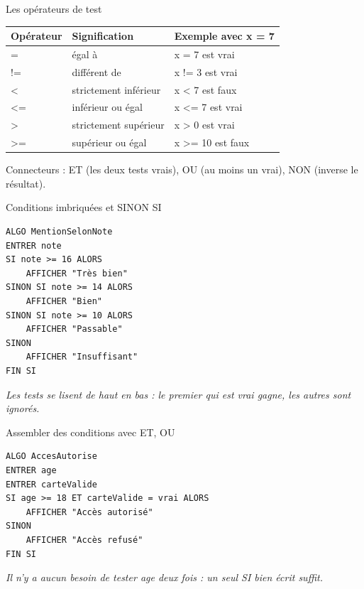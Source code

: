 \documentclass[aspectratio=169,11pt]{beamer}
\begin{document}
\begin{frame}{Les opérateurs de test}
\renewcommand{\arraystretch}{1.3}\small
\begin{center}
\begin{tabular}{lll}
\toprule
\textbf{\color{PyBleu}Opérateur} & \textbf{\color{PyBleu}Signification} & \textbf{\color{PyBleu}Exemple avec x = 7} \\
\midrule
= & égal à & x = 7 est vrai \\
!= & différent de & x != 3 est vrai \\
< & strictement inférieur & x < 7 est faux \\
<= & inférieur ou égal & x <= 7 est vrai \\
> & strictement supérieur & x > 0 est vrai \\
>= & supérieur ou égal & x >= 10 est faux \\
\bottomrule
\end{tabular}
\end{center}

\vspace{4pt}

{\small\color{PyGris}Connecteurs : ET (les deux tests vrais), OU (au moins un vrai), NON (inverse le résultat).}
\end{frame}

\begin{frame}[fragile]{Conditions imbriquées et SINON SI}

\begin{lstlisting}[style=py]
ALGO MentionSelonNote
ENTRER note
SI note >= 16 ALORS
    AFFICHER "Très bien"
SINON SI note >= 14 ALORS
    AFFICHER "Bien"
SINON SI note >= 10 ALORS
    AFFICHER "Passable"
SINON
    AFFICHER "Insuffisant"
FIN SI
\end{lstlisting}
\vspace{0.5pt}

{\small\color{PyGris}\itshape Les tests se lisent de haut en bas : le premier qui est vrai gagne, les autres sont ignorés.}

\end{frame}

\begin{frame}[fragile]{Assembler des conditions avec ET, OU}

\begin{lstlisting}[style=py]
ALGO AccesAutorise
ENTRER age
ENTRER carteValide
SI age >= 18 ET carteValide = vrai ALORS
    AFFICHER "Accès autorisé"
SINON
    AFFICHER "Accès refusé"
FIN SI
\end{lstlisting}
\vspace{0.5pt}

{\small\color{PyGris}\itshape Il n'y a aucun besoin de tester age deux fois : un seul SI bien écrit suffit.}

\end{frame}
\end{document}
